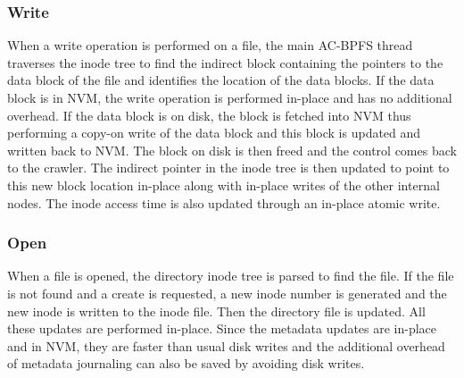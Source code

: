 \subsubsection{Write}
When a write operation is performed on a file, the main AC-BPFS thread traverses the inode tree to find the indirect block containing the pointers to the data block of the file and identifies the location of the data blocks. If the data block is in NVM, the write operation is performed in-place and has no additional overhead. If the data block is on disk, the block is fetched into NVM thus performing a copy-on write of the data block and this block is updated and written back to NVM. The block on disk is then freed and the control comes back to the crawler. The indirect pointer in the inode tree is then updated to point to this new block location in-place along with in-place writes of the other internal nodes. The inode access time is also updated through an in-place atomic write.

\subsubsection{Open}
When a file is opened, the directory inode tree is parsed to find the file. If the file is not found and a create is requested, a new inode number is generated and the new inode is written to the inode file. Then the directory file is updated. All these updates are performed in-place. Since the metadata updates are in-place and in NVM, they are faster than usual disk writes and the additional overhead of metadata journaling can also be saved by avoiding disk writes.
